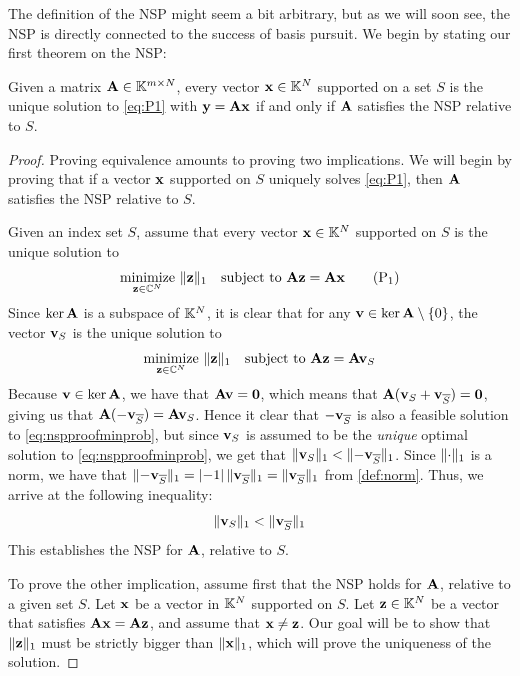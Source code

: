 The definition of the NSP might seem a bit arbitrary, but as we will soon see, the NSP is directly connected to the success of basis pursuit. We begin by stating our first theorem on the NSP:

\begin{theorem}
	\label{thm:NSP_to_basis_special}
	Given a matrix $ \mathbf{A} \in \mathbb{K}^{m \times N} $, every vector $ \mathbf{x} \in \mathbb{K}^{N} $ supported on a set $ S $ is the unique solution to \eqref{eq:P1} with $ \mathbf{y} = \mathbf{A}\mathbf{x} $ if and only if $ \mathbf{A} $ satisfies the NSP relative to $ S $. 
\end{theorem}

\begin{proof}
	Proving equivalence amounts to proving two implications. We will begin by proving that if a vector $ \mathbf{x} $ supported on $ S $ uniquely solves \eqref{eq:P1}, then $ \mathbf{A} $ satisfies the NSP relative to $ S $.
	
	Given an index set $ S $, assume that every vector $ \mathbf{x} \in \mathbb{K}^{N} $ supported on $ S $ is the unique solution to
	\[
		\underset{\mathbf{z} \in \mathbb{C}^{N}}{\text{minimize}}~ \lVert\mathbf{z}\rVert_1
		\quad\text{subject to}~ \mathbf{A}\mathbf{z} = \mathbf{A}\mathbf{x}
		\tag{P$_1$}
	\]
	Since $ \ker\mathbf{A} $ is a subspace of $ \mathbb{K}^{N} $, it is clear that for any $ \mathbf{v} \in \ker\mathbf{A}\setminus\{0\} $, the vector $ \mathbf{v}_{S} $ is the unique solution to 
	\begin{equation}
		\label{eq:nspproofminprob}
		\underset{\mathbf{z} \in \mathbb{C}^{N}}{\text{minimize}}~ \lVert\mathbf{z}\rVert_1
		\quad\text{subject to}~ \mathbf{A}\mathbf{z} = \mathbf{A}\mathbf{v}_{S}
	\end{equation}
	Because $ \mathbf{v} \in \ker\mathbf{A} $, we have that $ \mathbf{A}\mathbf{v} = \mathbf{0} $, which means that $ \mathbf{A}(\mathbf{v}_{S} + \mathbf{v}_{\overline{S}}) = \mathbf{0} $, giving us that $ \mathbf{A}(-\mathbf{v}_{\overline{S}}) = \mathbf{A}\mathbf{v}_{S} $. Hence it clear that $ -\mathbf{v}_{\overline{S}} $ is also a feasible solution to \eqref{eq:nspproofminprob}, but since $ \mathbf{v}_{S} $ is assumed to be the \textit{unique} optimal solution to \eqref{eq:nspproofminprob}, we get that $ \lVert\mathbf{v}_{S}\rVert_{1} < \lVert-\mathbf{v}_{\overline{S}}\rVert_{1} $. Since $ \lVert\cdot\rVert_{1} $ is a norm, we have that $ \lVert-\mathbf{v}_{\overline{S}}\rVert_{1} = \left|-1\right|\lVert\mathbf{v}_{\overline{S}}\rVert_{1} = \lVert\mathbf{v}_{\overline{S}}\rVert_{1} $ from \cref{def:norm}. Thus, we arrive at the following inequality:
	\[
		\lVert\mathbf{v}_{S}\rVert_{1} < \lVert\mathbf{v}_{\overline{S}}\rVert_{1}
	\]
	This establishes the NSP for $ \mathbf{A} $, relative to $ S $.
	
	To prove the other implication, assume first that the NSP holds for $ \mathbf{A} $, relative to a given set $ S $. Let $ \mathbf{x} $ be a vector in $ \mathbb{K}^{N} $ supported on $ S $. Let $ \mathbf{z} \in \mathbb{K}^{N} $ be a vector that satisfies $ \mathbf{A}\mathbf{x} = \mathbf{A}\mathbf{z} $, and assume that $ \mathbf{x} \neq \mathbf{z} $. Our goal will be to show that $ \lVert\mathbf{z}\rVert_{1} $ must be strictly bigger than $ \lVert\mathbf{x}\rVert_{1} $, which will prove the uniqueness of the solution. 
	

\end{proof}
